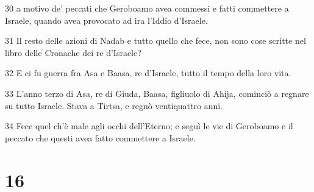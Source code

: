 \par 30 a motivo de' peccati che Geroboamo avea commessi e fatti commettere a Israele, quando avea provocato ad ira l'Iddio d'Israele.
\par 31 Il resto delle azioni di Nadab e tutto quello che fece, non sono cose scritte nel libro delle Cronache dei re d'Israele?
\par 32 E ci fu guerra fra Asa e Baasa, re d'Israele, tutto il tempo della loro vita.
\par 33 L'anno terzo di Asa, re di Giuda, Baasa, figliuolo di Ahija, cominciò a regnare su tutto Israele. Stava a Tirtsa, e regnò ventiquattro anni.
\par 34 Fece quel ch'è male agli occhi dell'Eterno; e seguì le vie di Geroboamo e il peccato che questi avea fatto commettere a Israele.

\chapter{16}

